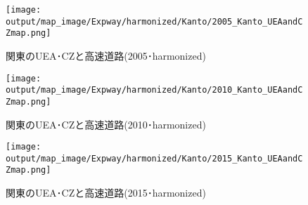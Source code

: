 \documentclass{ltjsarticle}
\begin{document}
\begin{figure}[pbth]
  \centering
  \texttt{[image: output/map\_image/Expway/harmonized/Kanto/2005\_Kanto\_UEAandCZmap.png]}
  \caption{\label{ham:2005:KanCZandUEA:Expway}関東のUEA･CZと高速道路(2005･harmonized)}
\end{figure}


\begin{figure}[pbth]
  \centering
  \texttt{[image: output/map\_image/Expway/harmonized/Kanto/2010\_Kanto\_UEAandCZmap.png]}
  \caption{\label{ham:2010:KanCZandUEA:Expway}関東のUEA･CZと高速道路(2010･harmonized)}
\end{figure}


\begin{figure}[pbth]
  \centering
  \texttt{[image: output/map\_image/Expway/harmonized/Kanto/2015\_Kanto\_UEAandCZmap.png]}
  \caption{\label{ham:2015:KanCZandUEA:Expway}関東のUEA･CZと高速道路(2015･harmonized)}
\end{figure}
\end{document}

